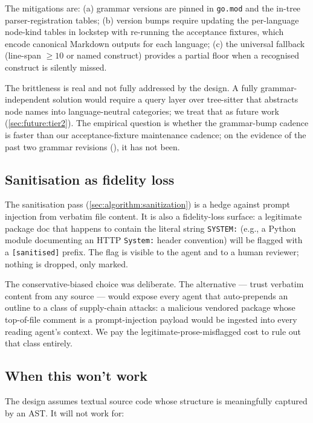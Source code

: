 The mitigations are: (a) grammar versions are pinned in
\texttt{go.mod} and the in-tree parser-registration tables;
(b) version bumps require updating the per-language node-kind tables
in lockstep with re-running the acceptance fixtures, which encode
canonical Markdown outputs for each language;
(c) the universal fallback (line-span $\geq 10$ or named construct)
provides a partial floor when a recognised construct is silently
missed.

The brittleness is real and not fully addressed by the design. A
fully grammar-independent solution would require a query layer over
tree-sitter that abstracts node names into language-neutral
categories; we treat that as future work
(\cref{sec:future:tier2}). The empirical question is whether the
grammar-bump cadence is faster than our acceptance-fixture
maintenance cadence; on the evidence of the past two grammar
revisions (), it has not
been.

\subsection{Sanitisation as fidelity loss}
\label{sec:discussion:sanitization}

The sanitisation pass (\cref{sec:algorithm:sanitization}) is a hedge
against prompt injection from verbatim file content. It is also a
fidelity-loss surface: a legitimate package doc that happens to
contain the literal string \texttt{SYSTEM:} (e.g., a Python module
documenting an HTTP \texttt{System:} header convention) will be
flagged with a \texttt{[sanitised]} prefix. The flag is visible to
the agent and to a human reviewer; nothing is dropped, only marked.

The conservative-biased choice was deliberate. The alternative ---
trust verbatim content from any source --- would expose every agent
that auto-prepends an outline to a class of supply-chain attacks: a
malicious vendored package whose top-of-file comment is a
prompt-injection payload would be ingested into every reading
agent's context. We pay the legitimate-prose-misflagged cost to rule
out that class entirely.

\subsection{When this won't work}
\label{sec:discussion:limits}

The design assumes textual source code whose structure is meaningfully
captured by an AST. It will not work for:

